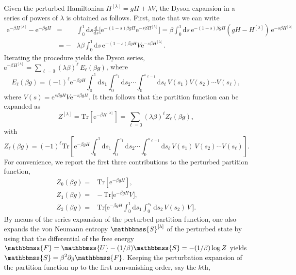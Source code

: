 \documentclass[aps,pra,floatfix,twocolumn,groupedaddress,superscriptaddress,nofootinbib,notitlepage,amsmath,amssymb,]{revtex4-1}
\begin{document}
\begin{widetext}
Given the perturbed Hamiltonian $H^{[\lambda]}=g H+\lambda V$, the Dyson expansion in a series of powers of $\lambda$ is obtained as follows.
First, note that we can write
\begin{eqnarray*}
\mathrm{e}^{-\beta  H^{[\lambda]}}-\mathrm{e}^{-\beta g H}&=& \int_0^{1}\mathrm{d}s \frac{\mathrm{d}}{\mathrm{d}s}\bigg[\mathrm{e}^{-(1-s)\beta g H} \mathrm{e}^{-s\beta H^{[\lambda]}}\bigg] =\beta\int_0^{1}\mathrm{d}s\,\mathrm{e}^{-(1-s)\beta g H}(g H-H^{[\lambda]})\,\mathrm{e}^{-s\beta H^{[\lambda]}}\\
&=-&\lambda \beta \int_0^{1}\mathrm{d}s\,\mathrm{e}^{-(1-s)\beta g H} V \mathrm{e}^{-s\beta H^{[\lambda]}}.
\end{eqnarray*}
Iterating the procedure yields the Dyson series, $\mathrm{e}^{-\beta H^{[\lambda]}}=\sum_{\ell=0}(\lambda\beta)^{\ell}\,E_\ell(\beta g)$,
where
\begin{equation}
\label{Dyson}
E_{\ell} (\beta g)=(-1)^{\ell}\mathrm{e}^{-\beta g H} \int_0^1\mathrm{d}s_1\int_0^{s_1}\mathrm{d}s_2\cdots\int_0^{s_{\ell-1}}\mathrm{d}s_{\ell}\,V(s_1)V(s_2)\cdots V(s_{\ell}),
\end{equation}
where $V(s)=\mathrm{e}^{s\beta g H} V \mathrm{e}^{-s\beta gH}$. It then follows that the partition function can be expanded as 
\begin{equation}
\label{partition1}	
Z^{[\lambda]} =\mathrm{Tr}[\mathrm{e}^{-\beta H^{[\lambda]}}] =\textstyle{\sum_{\ell=0}}(\lambda\beta)^{\ell}Z_\ell(\beta g),
\end{equation}
with
\begin{equation}
Z_\ell(\beta g)=(-1)^\ell\mathrm{Tr}\left[\mathrm{e}^{-\beta g H} \int_0^1\mathrm{d}s_1\int_0^{s_1}\mathrm{d}s_2\cdots\int_0^{s_{\ell-1}}\mathrm{d}s_{\ell}\,V(s_1)\,V(s_2)\cdots V(s_{\ell})\right].
\end{equation}
For convenience, we report the first three contributions to the perturbed partition function,
\begin{align}
\label{pertpart0}
Z_0(\beta g)=&\mathrm{Tr}[\mathrm{e}^{-\beta g H}],
\\
\label{pertpart1}
Z_1(\beta g)=&-\,\mathrm{Tr}[\mathrm{e}^{-\beta g H} V\Big],
\\
\label{pertpart2}
Z_2(\beta g)=&\mathrm{Tr}\Big[\mathrm{e}^{-\beta g H} \int_0^1\mathrm{d}s_1\int_0^{s_1}\mathrm{d}s_2\, V(s_2)\,V\,\Big].
\end{align}
By means of the series expansion of the perturbed partition function, one also expands the von Neumann entropy $\mathbbmss{S}^{[\lambda]}$ of the perturbed state by using that the differential of the free energy $\mathbbmss{F}=\mathbbmss{U}-(1/\beta)\mathbbmss{S}=-(1/\beta)\log Z$ yields $\displaystyle \mathbbmss{S}=\beta^2\partial_\beta \mathbbmss{F}$. Keeping the perturbation expansion of the partition function up to the first nonvanishing order, say the $k$th,  

\end{widetext}
\end{document}
